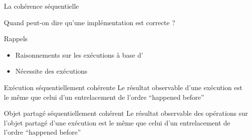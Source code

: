
\begingroup

\begin{frame}[fragile]{La cohérence séquentielle}

  \begin{center}
    \alert{Quand peut-on dire qu'une implémentation est \alert{correcte} ?}
  \end{center}    

  \begin{block}{Rappels}
    \begin{itemize}
    \item Raisonnements sur les exécutions à base d'
    \item Nécessite des exécutions 
    \end{itemize}
  \end{block}

  \begin{block}{Exécution séquentiellement cohérente}
    Le résultat observable d'une exécution est le même que celui d'un entrelacement de l'ordre ``happened before''
  \end{block}

  \pause

  \begin{block}{Objet partagé séquentiellement cohérent}
    Le résultat observable \alert{des opérations sur l'objet partagé} d'une exécution est le même que celui d'un entrelacement de l'ordre ``happened before''
  \end{block}

\end{frame}

\endgroup
\endinput
